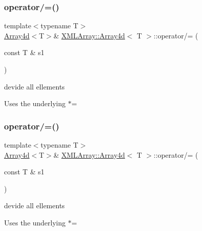 \subsubsection{\texorpdfstring{operator/=()}{operator/=()}\hspace{0.1cm}{\footnotesize\ttfamily [4/6]}}
{\footnotesize\ttfamily template$<$typename T$>$ \\
\mbox{\hyperlink{classXMLArray_1_1Array4d}{Array4d}}$<$T$>$\& \mbox{\hyperlink{classXMLArray_1_1Array4d}{X\+M\+L\+Array\+::\+Array4d}}$<$ T $>$\+::operator/= (\begin{DoxyParamCaption}\item[{const T \&}]{s1 }\end{DoxyParamCaption})\hspace{0.3cm}{\ttfamily [inline]}}



devide all ellements 

Uses the underlying $\ast$= \mbox{\label{classXMLArray_1_1Array4d_a22b262f7b7905313ae8e21d5e2d717a7}} 
\subsubsection{\texorpdfstring{operator/=()}{operator/=()}\hspace{0.1cm}{\footnotesize\ttfamily [5/6]}}
{\footnotesize\ttfamily template$<$typename T$>$ \\
\mbox{\hyperlink{classXMLArray_1_1Array4d}{Array4d}}$<$T$>$\& \mbox{\hyperlink{classXMLArray_1_1Array4d}{X\+M\+L\+Array\+::\+Array4d}}$<$ T $>$\+::operator/= (\begin{DoxyParamCaption}\item[{const T \&}]{s1 }\end{DoxyParamCaption})\hspace{0.3cm}{\ttfamily [inline]}}



devide all ellements 

Uses the underlying $\ast$= \mbox{\label{classXMLArray_1_1Array4d_a22b262f7b7905313ae8e21d5e2d717a7}} 
